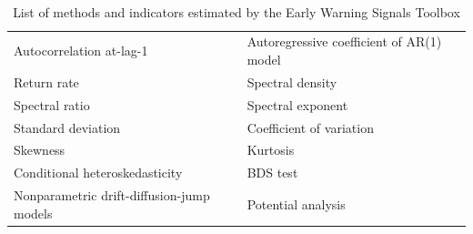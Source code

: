 \documentclass[12pt,a4paper,final]{article}
\begin{document}
\begin{table}[h]
\centering
\caption{List of methods and indicators estimated by the Early Warning Signals Toolbox}  \\ [1ex]
\begin{tabular}{l l}%
\hline
\hline
Autocorrelation at-lag-1 &	%
Autoregressive coefficient of AR(1) model	\\ %
Return rate &	%
Spectral density \\%
Spectral ratio &	%
Spectral exponent\\	%
Standard deviation &	%
Coefficient of variation\\	%
Skewness &	%
Kurtosis	\\%
Conditional heteroskedasticity	&%
BDS test	\\%
Nonparametric drift-diffusion-jump models	&%
Potential analysis	\\ [0.5ex]%
\hline
\hline
\end{tabular}
\label{methods_table}
\end{table}%
\end{document}
